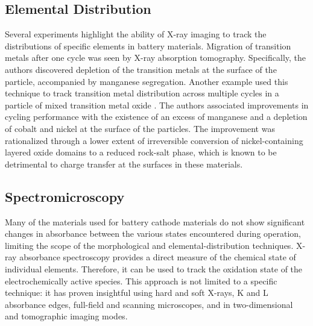 \documentclass[journal=cmatex,manuscript=perspective]{achemso}
\begin{document}
\subsection{Elemental Distribution}
Several experiments highlight the ability of X-ray imaging to track
the distributions of specific elements in battery materials. Migration
of transition metals after one cycle was seen by X-ray absorption
tomography\cite{yang2014-2}. Specifically, the authors discovered
depletion of the transition metals at the surface of the particle,
accompanied by manganese segregation. Another example used this
technique to track transition metal distribution across multiple
cycles in a particle of mixed transition metal oxide
\cite{lin2016}. The authors
associated improvements in cycling performance with the existence of
an excess of manganese and a depletion of cobalt and nickel at the
surface of the particles. The improvement was rationalized through a
lower extent of irreversible conversion of nickel-containing layered
oxide domains to a reduced rock-salt phase, which is known to be
detrimental to charge transfer at the surfaces in these
materials\cite{xu2016-2}.


\subsection{Spectromicroscopy}

Many of the materials used for battery cathode materials do not show
significant changes in absorbance between the various states
encountered during operation, limiting the scope of the morphological
and elemental-distribution techniques. X-ray absorbance spectroscopy
provides a direct measure of the chemical state of individual
elements. Therefore, it can be used to track the oxidation state of
the electrochemically active species. This approach is not limited to
a specific technique: it has proven insightful using hard and soft
X-rays, K and L absorbance edges, full-field and scanning microscopes,
and in two-dimensional and tomographic imaging modes.
\end{document}
